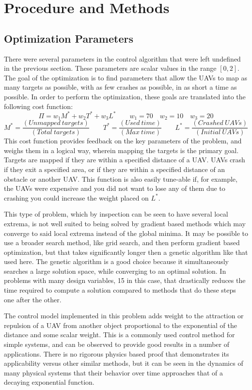 \documentclass[a4paper,12pt]{report}
\begin{document}
\section{Procedure and Methods}
\subsection{Optimization Parameters}
There were several parameters in the control algorithm that were left undefined in the previous section. These parameters are scalar values in the range $[0, 2]$. The goal of the optimization is to find parameters that allow the UAVs to map as many targets as possible, with as few crashes as possible, in as short a time as possible. In order to perform the optimization, these goals are translated into the following cost function:
$$\Pi = w_1M^* + w_2T^* + w_3L^* \qquad w_1 = 70 \quad w_2 = 10 \quad w_3 = 20$$
$$ M^* = \frac{(Unmapped\ targets)}{(Total\ targets)} \qquad T^* = \frac{(Used\ time)}{(Max\ time)} \qquad L^* = \frac{(Crashed\ UAVs)}{(Initial\ UAVs)}$$
This cost function provides feedback on the key parameters of the problem, and weighs them in a logical way, wherein mapping the targets is the primary goal. Targets are mapped if they are within a specified distance of a UAV. UAVs crash if they exit a specified area, or if they are within a specified distance of an obstacle or another UAV. This function is also easily tune-able if, for example, the UAVs were expensive and you did not want to lose any of them due to crashing you could increase the weight placed on $L^*$. 

This type of problem, which by inspection can be seen to have several local extrema, is not well suited to being solved by gradient based methods which may converge to said local extrema instead of the global minima. It may be possible to use a broader search method, like grid search, and then perform gradient based optimization, but that takes significantly longer then a genetic algorithm like that used here. The genetic algorithm is a good choice because it simultaneously searches a large solution space, while converging to an optimal solution. In problems with many design variables, 15 in this case, that drastically reduces the time required to compute a solution compared to methods that do these steps one after the other.

The control model implemented in this problem adds weight to the attraction or repulsion of a UAV from another object proportional to the exponential of the distance and some scalar weight. This is a commonly used control method for simple systems, and can be observed to provide good results in a number of applications. There is no rigorous physics based proof that demonstrates its applicability versus other similar methods, but it can be seen in the dynamics of many physical systems that their behavior over time approaches that of a decaying exponential function.
\end{document}
